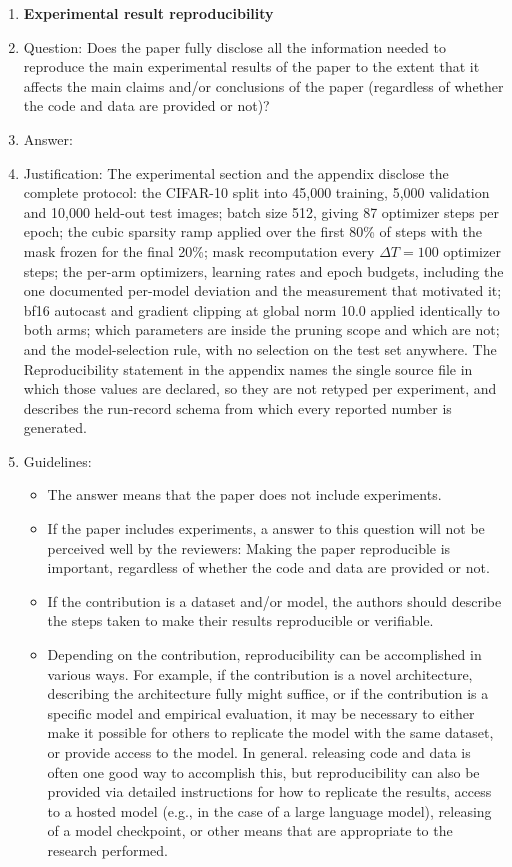 \begin{enumerate}
    \item {\bf Experimental result reproducibility}
    \item[] Question: Does the paper fully disclose all the information needed to reproduce the main experimental results of the paper to the extent that it affects the main claims and/or conclusions of the paper (regardless of whether the code and data are provided or not)?
    \item[] Answer: \answerYes{}
    \item[] Justification: The experimental section and the appendix disclose the complete protocol: the CIFAR-10 split into 45{,}000 training, 5{,}000 validation and 10{,}000 held-out test images; batch size 512, giving 87 optimizer steps per epoch; the cubic sparsity ramp applied over the first 80\% of steps with the mask frozen for the final 20\%; mask recomputation every $\Delta T = 100$ optimizer steps; the per-arm optimizers, learning rates and epoch budgets, including the one documented per-model deviation and the measurement that motivated it; bf16 autocast and gradient clipping at global norm 10.0 applied identically to both arms; which parameters are inside the pruning scope and which are not; and the model-selection rule, with no selection on the test set anywhere. The Reproducibility statement in the appendix names the single source file in which those values are declared, so they are not retyped per experiment, and describes the run-record schema from which every reported number is generated.
    \item[] Guidelines:
    \begin{itemize}
        \item The answer \answerNA{} means that the paper does not include experiments.
        \item If the paper includes experiments, a \answerNo{} answer to this question will not be perceived well by the reviewers: Making the paper reproducible is important, regardless of whether the code and data are provided or not.
        \item If the contribution is a dataset and\slash or model, the authors should describe the steps taken to make their results reproducible or verifiable.
        \item Depending on the contribution, reproducibility can be accomplished in various ways. For example, if the contribution is a novel architecture, describing the architecture fully might suffice, or if the contribution is a specific model and empirical evaluation, it may be necessary to either make it possible for others to replicate the model with the same dataset, or provide access to the model. In general. releasing code and data is often one good way to accomplish this, but reproducibility can also be provided via detailed instructions for how to replicate the results, access to a hosted model (e.g., in the case of a large language model), releasing of a model checkpoint, or other means that are appropriate to the research performed.

\end{itemize}
\end{enumerate}
